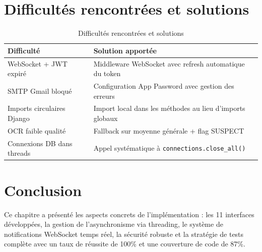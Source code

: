 \section{Difficultés rencontrées et solutions}
\begin{table}[htbp]
\centering
\caption{Difficultés rencontrées et solutions}
\label{tab:difficultes}
\begin{tabular}{p{5cm} p{9cm}}
\toprule
\textbf{Difficulté} & \textbf{Solution apportée} \\
\midrule
WebSocket + JWT expiré & Middleware WebSocket avec refresh automatique du token \\
SMTP Gmail bloqué & Configuration App Password avec gestion des erreurs \\
Imports circulaires Django & Import local dans les méthodes au lieu d'imports globaux \\
OCR faible qualité & Fallback sur moyenne générale + flag SUSPECT \\
Connexions DB dans threads & Appel systématique à \texttt{connections.close\_all()} \\
\bottomrule
\end{tabular}
\end{table}

\section{Conclusion}
Ce chapitre a présenté les aspects concrets de l'implémentation : les 11 interfaces développées, la gestion de l'asynchronisme via threading, le système de notifications WebSocket temps réel, la sécurité robuste et la stratégie de tests complète avec un taux de réussite de 100\% et une couverture de code de 87\%.
